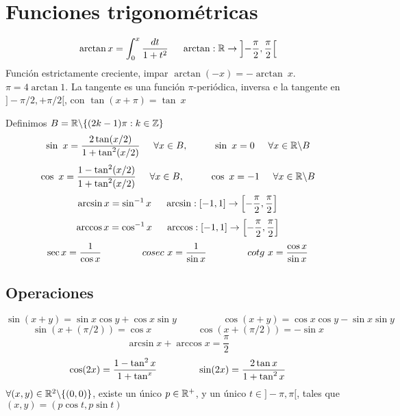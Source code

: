 \section{Funciones trigonométricas}
$$\arctan x = \int_0^x \frac{dt}{1+t^2}\hspace{0.5cm} \arctan : \mathbb{R}\rightarrow \left]-\frac{\pi}{2}, \frac{\pi}{2} \right[$$
Función estrictamente creciente, impar $\arctan(-x) = -\arctan \ x$. $\pi = 4\arctan 1$.
La tangente es una función $\pi$-periódica, inversa e la tangente en $]-\pi/2,+\pi/2[$, con $\tan (x+\pi) = \tan \ x$

Definimos $B=\mathbb{R}\backslash\{(2k-1)\pi : k\in\mathbb{Z}\}$
$$ \sin \ x = \frac{2\tan (x/2)}{1+\tan^2 (x/2)} \hspace{0.5cm} \forall x\in B, \hspace{1cm} \sin \ x = 0\hspace{0.5cm} \forall x\in\mathbb{R}\backslash B $$ 
$$ \cos \ x = \frac{1-\tan^2 (x/2)}{1+\tan^2 (x/2)} \hspace{0.5cm} \forall x\in B, \hspace{1cm} \cos \ x = -1\hspace{0.5cm} \forall x\in\mathbb{R}\backslash B $$
$$ \arcsin x = \sin^{-1}x \hspace{0.5cm} \arcsin:[-1, 1] \rightarrow\left[-\frac{\pi}{2}, \frac{\pi}{2}\right]$$
$$ \arccos x = \cos^{-1}x \hspace{0.5cm} \arccos:[-1, 1] \rightarrow\left[-\frac{\pi}{2}, \frac{\pi}{2}\right] $$
$$ \sec x = \frac{1}{\cos x}\hspace{1.5cm}
cosec \ x=\frac{1}{\sin x} \hspace{1.5cm}
cotg \ x =\frac{\cos x}{\sin x}
$$
\subsection{Operaciones}
$$ \sin(x+y) = \sin x\cos y + \cos x\sin y \hspace{2cm}
\cos(x+y) = \cos x\cos y-\sin x\sin y$$
$$ \sin (x+(\pi/2)) = \cos x\hspace{2cm} \cos (x+(\pi/2)) = -\sin x $$
$$ \arcsin x+\arccos x = \frac{\pi}{2} $$
$$ \cos (2x) = \frac{1-\tan^2 x}{1+\tan^x}\hspace{1.5cm} \sin (2x) = \frac{2\tan x}{1+\tan^2 x} $$
$\forall(x,y)\in\mathbb{R}^2\backslash\{(0,0)\}$, existe un único $p\in\mathbb{R}^+$, y un único $t\in]-\pi, \pi[$, tales que $(x,y) = (p\cos t,p\sin t)$